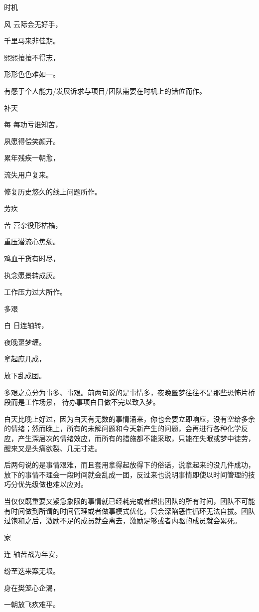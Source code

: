 \documentclass{article}
\newenvironment{poem}[3]{
\begin{minipage}{\textwidth}
\begin{pinyinscope}\begin{center}\Large\linespread{1.4}\selectfont #2\end{center}\end{pinyinscope}
\begin{pinyinscope}
	\begin{center}
	\Large\linespread{1.4}\rmfamily\selectfont #3
}{\end{center}
\end{pinyinscope}
\end{minipage}
}
\begin{document}
\begin{poem}{}{时机}
风云际会无好手，

千里马来非佳期。

熙熙攘攘不得志，

形形色色难如一。
\end{poem}

有感于个人能力/发展诉求与项目/团队需要在时机上的错位而作。

\begin{poem}{}{补天}
每每功亏谁知苦，

夙愿得偿笑颜开。

累年残疾一朝愈，

流失用户{}复来。
\end{poem}

修复历史悠久的线上问题所作。

\begin{poem}{}{劳疾}
苦营杂役形枯槁，

重压潜流心焦颓。

鸡血干货有时尽，

执念愿景转成灰。
\end{poem}

工作压力过大所作。

\begin{poem}{}{多艰}
白日连轴转，

夜晚噩梦缠。

拿起庶几成，

放下乱成团。
\end{poem}

多艰之意分为事多、事艰。前两句说的是事情多，夜晚噩梦往往不是那些恐怖片桥段而是工作场景， 待办事项白日做不完以致入梦。

白天比晚上好过，因为白天有无数的事情涌来，你也会要立即响应，没有空给多余的情绪；然而晚上，所有的未解问题和今天新产生的问题，会再进行各种化学反应，产生深层次的情绪效应，而所有的措施都不能采取，只能在失眠或梦中徒劳，醒来又是头痛欲裂、几无寸进。

后两句说的是事情艰难，而且套用拿得起放得下的俗话，说拿起来的没几件成功，放下的事情不理会一段时间就会乱成一团，反过来也说明事情即使以时间管理的技巧分优先级做也难以应对。

当仅仅既重要又紧急象限的事情就已经耗完或者超出团队的所有时间，团队不可能有时间做到所谓的时间管理或者做事模式优化，只会深陷恶性循环无法自拔。团队过饱和之后，激励不足的成员就会离去，激励足够或者内驱的成员就会累死。

\begin{poem}{}{{\xpinyin{还}{huan2}}家}
连轴苦战为年安，

纷至迭来案无垠。

身在樊笼心企渴，

一朝放飞疚难平。
\end{poem}
\end{document}
